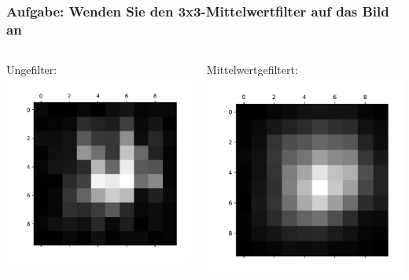 \documentclass[aspectratio=169]{beamer}
\begin{document}
\begin{frame}
    \frametitle{Aufgabe: Wenden Sie den 3x3-Mittelwertfilter auf das Bild an}
\begin{columns}
    \begin{column}{0.5\textwidth}
    \begin{alertblock}
        {Ungefilter:}
        \includegraphics[width=1\textwidth]{../raw.pdf}
    \end{alertblock}
    \end{column}
    \begin{column}{0.5\textwidth}
    \begin{alertblock}
        {Mittelwertgefiltert:}
        \includegraphics[width=1\textwidth]{../mean.pdf}

\end{alertblock}
\end{column}
\end{columns}
\end{frame}
\end{document}
